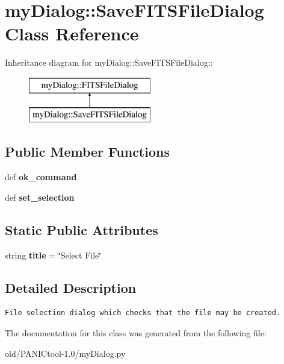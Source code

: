 \section{my\-Dialog::Save\-FITSFile\-Dialog Class Reference}
\label{classmyDialog_1_1SaveFITSFileDialog}
Inheritance diagram for my\-Dialog::Save\-FITSFile\-Dialog::\begin{figure}[H]
\begin{center}
\leavevmode
\includegraphics[height=2cm]{classmyDialog_1_1SaveFITSFileDialog}
\end{center}
\end{figure}
\subsection*{Public Member Functions}
\begin{CompactItemize}
\item 
def \textbf{ok\_\-command}\label{classmyDialog_1_1SaveFITSFileDialog_194944e127e2a406375d9fb4fe692736}

\item 
def \textbf{set\_\-selection}\label{classmyDialog_1_1SaveFITSFileDialog_9769e3a5c6ac4096d9d6f418c215bfa8}

\end{CompactItemize}
\subsection*{Static Public Attributes}
\begin{CompactItemize}
\item 
string \textbf{title} = \char`\"{}Select File\char`\"{}\label{classmyDialog_1_1SaveFITSFileDialog_9c6b6a9c577c977075ba921d77a90d45}

\end{CompactItemize}


\subsection{Detailed Description}


\footnotesize\begin{verbatim}File selection dialog which checks that the file may be created.\end{verbatim}
\normalsize
 



The documentation for this class was generated from the following file:\begin{CompactItemize}
\item 
old/PANICtool-1.0/my\-Dialog.py\end{CompactItemize}
